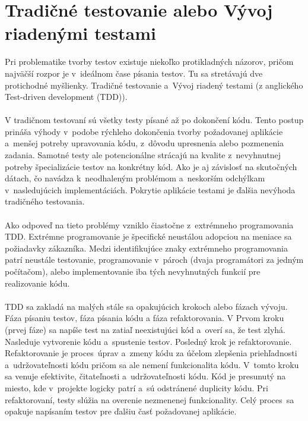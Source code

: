 \documentclass[
  digital, %
  table,   %
oneside,
  nolof,     %
  nolot,     %
]{fithesis3}
\begin{document}
\section{Tradičné testovanie alebo Vývoj riadenými testami}

Pri problematike tvorby testov existuje niekoľko protikladných názorov, pričom najväčší rozpor je v~ideálnom čase písania testov. Tu sa stretávajú dve protichodné myšlienky. Tradičné testovanie a~Vývoj riadený testami (z anglického  Test-driven development (TDD))\cite{softwareTesting}. \paragraph{}
V tradičnom testovaní sú všetky testy písané až po dokončení kódu. Tento postup prináša výhody v~podobe rýchleho dokončenia tvorby požadovanej aplikácie a~menšej potreby upravovania kódu, z~dôvodu upresnenia alebo pozmenenia zadania.
Samotné testy ale potencionálne strácajú na kvalite z~nevyhnutnej  potreby špecializácie testov na konkrétny kód. Ako je aj závislosť na skutočných dátach, čo navádza k~neodhaleným problémom a~neskorším odchýlkam v~nasledujúcich implementáciách. Pokrytie aplikácie testami je ďalšia nevýhoda tradičného testovania.  \paragraph{}
Ako odpoveď na tieto problémy vzniklo čiastočne z~extrémneho programovania TDD. Extrémne programovanie je špecifické neustálou adopciou na meniace sa požiadavky zákazníka. Medzi identifikujúce znaky extrémneho programovania patrí neustále testovanie, programovanie v~pároch (dvaja programátori za jedným počítačom), alebo implementovanie  iba tých nevyhnutných funkcií pre realizovanie kódu. \paragraph{}
TDD sa zakladá na malých stále sa opakujúcich krokoch alebo fázach vývoju. Fáza písaniu testov, fáza písania kódu a fáza refaktorovania.
V Prvom kroku (prvej fáze) sa napíše test na zatiaľ neexistujúci kód a~overí sa, že test zlyhá. Nasleduje vytvorenie kódu a~spustenie testov. Posledný krok je refaktorovanie. Refaktorovanie je proces~úprav a~zmeny kódu za účelom zlepšenia priehľadnosti a~udržovateľnosti kódu pričom sa ale nemení funkcionalita kódu. V~tomto kroku sa venuje efektivite, čitateľnosti a~udržovateľnosti kódu. Kód je presunutý na miesto, kde v~projekte logicky patrí a~sú odstránené duplicity kódu. Pri refaktorovaní, testy slúžia na overenie nezmenenej funkcionality. Celý proces~sa opakuje napísaním testov pre ďalšiu časť požadovanej aplikácie.
\end{document}
